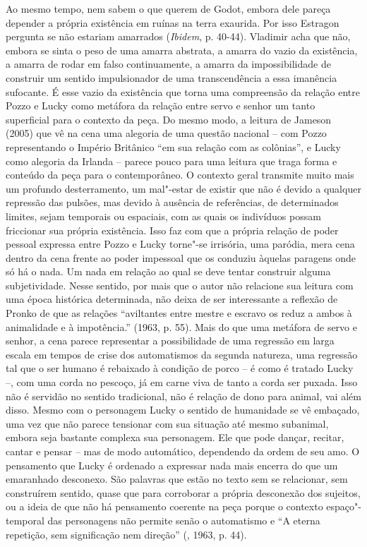 Ao mesmo tempo, nem sabem o que querem de Godot, embora dele pareça
depender a própria existência em ruínas na terra exaurida. Por isso
Estragon pergunta se não estariam amarrados (\emph{Ibidem}, p. 40-44).
Vladimir acha que não, embora se sinta o peso de uma amarra abstrata, a
amarra do vazio da existência, a amarra de rodar em falso continuamente,
a amarra da impossibilidade de construir um sentido impulsionador de uma
transcendência a essa imanência sufocante. É esse vazio da existência
que torna uma compreensão da relação entre Pozzo e Lucky como metáfora
da relação entre servo e senhor um tanto superficial para o contexto da
peça. Do mesmo modo, a leitura de Jameson (2005) que vê na cena uma
alegoria de uma questão nacional -- com Pozzo representando o Império
Britânico ``em sua relação com as colônias'', e Lucky como alegoria da
Irlanda -- parece pouco para uma leitura que traga forma e conteúdo da
peça para o contemporâneo. O contexto geral transmite muito mais um
profundo desterramento, um mal"-estar de existir que não é devido a
qualquer repressão das pulsões, mas devido à ausência de referências, de
determinados limites, sejam temporais ou espaciais, com as quais os
indivíduos possam friccionar sua própria existência. Isso faz com que a
própria relação de poder pessoal expressa entre Pozzo e Lucky torne"-se
irrisória, uma paródia, mera cena dentro da cena frente ao poder
impessoal que os conduziu àquelas paragens onde só há o nada. Um nada em
relação ao qual se deve tentar construir alguma subjetividade. Nesse
sentido, por mais que o autor não relacione sua leitura com uma época
histórica determinada, não deixa de ser interessante a reflexão de
Pronko de que as relações ``aviltantes entre mestre e escravo os reduz a
ambos à animalidade e à impotência.'' (1963, p. 55). Mais do que uma
metáfora de servo e senhor, a cena parece representar a possibilidade de
uma regressão em larga escala em tempos de crise dos automatismos da
segunda natureza, uma regressão tal que o ser humano é rebaixado à
condição de porco -- é como é tratado Lucky --, com uma corda no
pescoço, já em carne viva de tanto a corda ser puxada. Isso não é
servidão no sentido tradicional, não é relação de dono para animal, vai
além disso. Mesmo com o personagem Lucky o sentido de humanidade se vê
embaçado, uma vez que não parece tensionar com sua situação até mesmo
subanimal, embora seja bastante complexa sua personagem. Ele que pode
dançar, recitar, cantar e pensar -- mas de modo automático, dependendo
da ordem de seu amo. O pensamento que Lucky é ordenado a expressar nada
mais encerra do que um emaranhado desconexo. São palavras que estão no
texto sem se relacionar, sem construírem sentido, quase que para
corroborar a própria desconexão dos sujeitos, ou a ideia de que não há
pensamento coerente na peça porque o contexto espaço"-temporal das
personagens não permite senão o automatismo e ``A eterna repetição, sem
significação nem direção'' (, 1963, p. 44).

